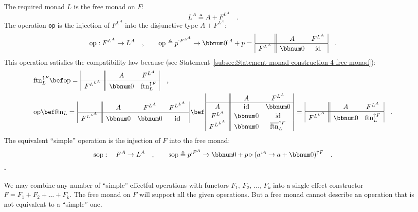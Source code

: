 The required monad $L$ is the free monad on $F$:
\[
L^{A}\triangleq A+F^{L^{A}}\quad.
\]
The operation \lstinline!op! is the injection of $F^{L^{A}}$ into
the disjunctive type $A+F^{L^{A}}$:
\[
\text{op}:F^{L^{A}}\rightarrow L^{A}\quad,\quad\quad\text{op}\triangleq p^{:F^{L^{A}}}\rightarrow\bbnum 0^{:A}+p=\,\begin{array}{|c||cc|}
 & A & F^{L^{A}}\\
\hline F^{L^{A}} & \bbnum 0 & \text{id}
\end{array}\quad.
\]
This operation satisfies the compatibility law because (see Statement~\ref{subsec:Statement-monad-construction-4-free-monad}):
\begin{align*}
 & \text{ftn}_{L}^{\uparrow F}\bef\text{op}=\,\begin{array}{|c||cc|}
 & A & F^{L^{A}}\\
\hline F^{L^{L^{A}}} & \bbnum 0 & \text{ftn}_{L}^{\uparrow F}
\end{array}\quad,\\
 & \text{op}\bef\text{ftn}_{L}=\,\begin{array}{|c||ccc|}
 & A & F^{L^{A}} & F^{L^{L^{A}}}\\
\hline F^{L^{L^{A}}} & \bbnum 0 & \bbnum 0 & \text{id}
\end{array}\,\bef\,\begin{array}{|c||cc|}
 & A & F^{L^{A}}\\
\hline A & \text{id} & \bbnum 0\\
F^{L^{A}} & \bbnum 0 & \text{id}\\
F^{L^{L^{A}}} & \bbnum 0 & \overline{\text{ftn}}_{L}^{\uparrow F}
\end{array}\,=\,\begin{array}{|c||cc|}
 & A & F^{L^{A}}\\
\hline F^{L^{L^{A}}} & \bbnum 0 & \text{ftn}_{L}^{\uparrow F}
\end{array}\quad.
\end{align*}
The equivalent \textsf{``}simple\textsf{''} operation is the injection of $F$ into
the free monad:
\[
\text{sop}:\quad F^{A}\rightarrow L^{A}\quad,\quad\quad\text{sop}\triangleq p^{:F^{A}}\rightarrow\bbnum 0+p\triangleright(a^{:A}\rightarrow a+\bbnum 0)^{\uparrow F}\quad.
\]
$\square$

We may combine any number of \textsf{``}simple\textsf{''} effectful operations with
functors $F_{1}$, $F_{2}$, ..., $F_{k}$ into a single effect constructor
$F=F_{1}+F_{2}+...+F_{k}$. The free monad on $F$ will support all
the given operations. But a free monad cannot describe an operation
that is not equivalent to a \textsf{``}simple\textsf{''} one.


